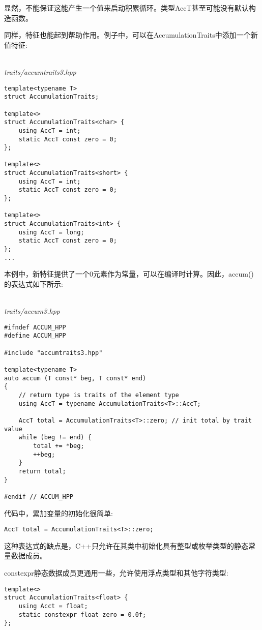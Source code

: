 显然，不能保证这能产生一个值来启动积累循环。类型AccT甚至可能没有默认构造函数。

同样，特征也能起到帮助作用。例子中，可以在AccumulationTraits中添加一个新值特征:

\hspace*{\fill} \\ %
\noindent
\textit{traits/accumtraits3.hpp}
\begin{lstlisting}[style=styleCXX]
template<typename T>
struct AccumulationTraits;

template<>
struct AccumulationTraits<char> {
	using AccT = int;
	static AccT const zero = 0;
};

template<>
struct AccumulationTraits<short> {
	using AccT = int;
	static AccT const zero = 0;
};

template<>
struct AccumulationTraits<int> {
	using AccT = long;
	static AccT const zero = 0;
};
...
\end{lstlisting}

本例中，新特征提供了一个0元素作为常量，可以在编译时计算。因此，accum()的表达式如下所示:

\hspace*{\fill} \\ %
\noindent
\textit{traits/accum3.hpp}
\begin{lstlisting}[style=styleCXX]
#ifndef ACCUM_HPP
#define ACCUM_HPP

#include "accumtraits3.hpp"

template<typename T>
auto accum (T const* beg, T const* end)
{
	// return type is traits of the element type
	using AccT = typename AccumulationTraits<T>::AccT;
	
	AccT total = AccumulationTraits<T>::zero; // init total by trait value
	while (beg != end) {
		total += *beg;
		++beg;
	}
	return total;
}

#endif // ACCUM_HPP
\end{lstlisting}

代码中，累加变量的初始化很简单:

\begin{lstlisting}[style=styleCXX]
AccT total = AccumulationTraits<T>::zero;
\end{lstlisting}

这种表达式的缺点是，C++只允许在其类中初始化具有整型或枚举类型的静态常量数据成员。

constexpr静态数据成员更通用一些，允许使用浮点类型和其他字符类型:

\begin{lstlisting}[style=styleCXX]
template<>
struct AccumulationTraits<float> {
	using Acct = float;
	static constexpr float zero = 0.0f;
};
\end{lstlisting}

